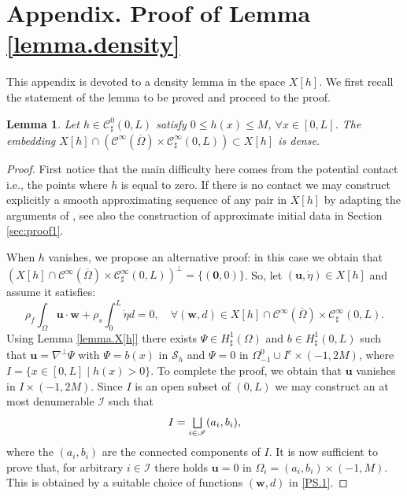 \documentclass[11pt]{article}
\newcommand{\ie}{i.e.,\xspace}
\let\mathcal\mathscr
\let\oldbigsqcup\bigsqcup
\renewcommand{\bigsqcup}{\mathop{\textstyle\oldbigsqcup}\displaylimits}
\newtheorem{lemma}[theorem]{Lemma}
\theoremstyle{remark}
\theoremstyle{definition}
\newcommand{\ug}{\boldsymbol{u}}
\newcommand{\wg}{\boldsymbol{w}}
\newcommand{\BS}[1]{\boldsymbol{#1}}
\let\CM\Omega
\newcommand{\etap}{\dot{\eta}}
\begin{document}
\appendix
\section*{Appendix. Proof of Lemma \ref{lemma.density}}
\label{Annexe}
This appendix is devoted to a density lemma in the space $X[h]$.
We first recall the statement of the lemma to be proved and proceed
to the proof.

\begin{lemma}\label{lemma.density.app}
Let $h \in \mathcal C^0_{\sharp}(0,L)$ satisfy $0 \leq h(x) \leq M$, $\forall x\in [0, L]$. The embedding $X[h]\cap (\mathcal{C}^{\infty}(\overline{\CM}) \times \mathcal C^{\infty}_{\sharp}(0,L)) \subset X[h]$ is dense.
\end{lemma}

\begin{proof}
First notice that the main difficulty here comes from the potential contact \ie the points where $h$ is equal to zero. If there is no contact we may construct explicitly a smooth approximating sequence of any pair in $X[h]$ by adapting the arguments of \cite{Chambolle-etal}, see also the construction of approximate initial data in Section \ref{sec:proof1}.

When $h$ vanishes, we propose an alternative proof: in this case we obtain that $(X[h]\cap \mathcal{C}^{\infty}(\overline{\CM}) \times \mathcal C^{\infty}_{\sharp}(0,L))^{\perp}=\{(\BS{0},0)\}$. So, let $(\ug,\etap) \in X[h]$ and assume it satisfies:%
\begin{equation}\label{PS.1}\rho_{f}\int_{\CM}\ug\cdot\wg +\rho_{s}\int_{0}^{L}\etap d=0, \quad
\forall (\wg,d)\in X[h]\cap \mathcal{C}^{\infty}(\overline{\CM}) \times \mathcal C^{\infty}_{\sharp}(0,L).
\end{equation}
Using Lemma \ref{lemma.X[h]} there exists $\Psi\in H^{1}_{\sharp}(\CM)$ and $b\in H^{1}_{\sharp}(0,L)$ such that $\ug=\nabla^{\bot}\Psi$ with $\Psi=b(x)$ in $\mathcal{S}_{h}$ and $\Psi=0$ in $\Omega^{0}_{-1} \cup I^{c}\times(-1,2M)$, where $I=\{x\in[0,L]\mid h(x)>0\}$. To complete the proof, we obtain that $\ug$ vanishes in $I\times(-1,2M)$.
Since $I$ is an open subset of $(0,L)$ we may construct an at most denumerable $\mathcal I$ such that
\[
I=\bigsqcup_{i\in\mathcal I}(a_{i},b_{i}),
\]
where the $(a_{i},b_{i})$ are the connected components of $I$. It is now sufficient to prove that, for arbitrary $i\in \mathcal I$ there holds $\ug=0$ in $\CM_{i}=(a_{i},b_{i})\times(-1,M)$. This is obtained by a suitable choice of functions $(\wg,d)$ in \eqref{PS.1}.


\end{proof}
\end{document}
